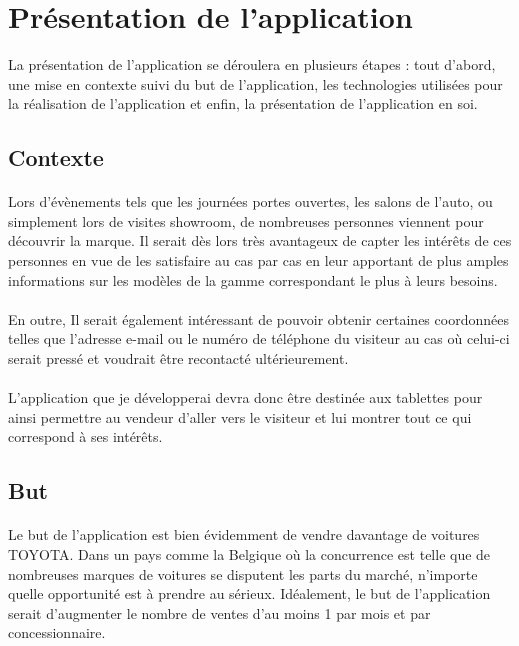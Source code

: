 \documentclass[12pt]{report}
\begin{document}
\section{Présentation de l'application}
La présentation de l'application se déroulera en plusieurs étapes : tout d'abord, une mise en contexte suivi du but de l'application, les technologies utilisées pour la réalisation de l'application et enfin, la présentation de l'application en soi.

\subsection{Contexte}
\paragraph{}
Lors d'évènements tels que les journées portes ouvertes, les salons de l'auto, ou simplement lors de visites showroom, de nombreuses personnes viennent pour découvrir la marque. 
Il serait dès lors très avantageux de capter les intérêts de ces personnes en vue de les satisfaire au cas par cas en leur apportant de plus amples informations sur les modèles de la gamme correspondant le plus à leurs besoins.

\paragraph{}
En outre, Il serait également intéressant de pouvoir obtenir certaines coordonnées telles que l'adresse e-mail ou le  numéro de téléphone du visiteur au cas où celui-ci serait pressé et voudrait être recontacté ultérieurement.

\paragraph{}
L'application que je développerai devra donc être destinée aux tablettes pour ainsi permettre au vendeur d'aller vers le visiteur et lui montrer tout ce qui correspond à ses intérêts.

\subsection{But}
\paragraph{}
Le but de l'application est bien évidemment de vendre davantage de voitures TOYOTA. Dans un pays comme la Belgique où la concurrence est telle que de nombreuses marques de voitures se disputent les parts du marché, n'importe quelle opportunité est à prendre au sérieux. Idéalement, le but de l'application serait d'augmenter le nombre de ventes d'au moins 1 par mois et par concessionnaire.
\end{document}
